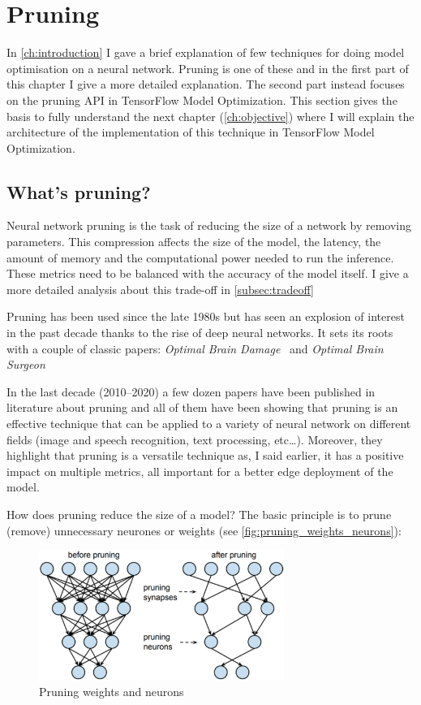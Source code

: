 \chapter{Pruning}\label{ch:pruning}
In \autoref{ch:introduction} I gave a brief explanation of few techniques for
doing model optimisation on a neural network. Pruning is one of these and in
the first part of this chapter I give a more detailed explanation.
The second part instead focuses on the pruning API in TensorFlow Model
Optimization.
This section gives the basis to fully understand the next chapter
(\autoref{ch:objective}) where I will explain the architecture of the
implementation of this technique in TensorFlow Model Optimization.

\section{What's pruning?}
Neural network pruning is the task of reducing the size of a network by
removing parameters. This compression affects the size of the model, the
latency, the amount of memory and the computational power needed to run the
inference. These metrics need to be balanced with the accuracy of the model
itself. I give a more detailed analysis about this trade-off in
\autoref{subsec:tradeoff}

Pruning has been used since the late 1980s but has seen an explosion of
interest in the past decade thanks to the rise of deep neural networks.
It sets its roots with a couple of classic papers: \textit{Optimal Brain
Damage}~\cite{lecun-90b} and \textit{Optimal Brain Surgeon}\cite{hassibi-93}

In the last decade (2010--2020) a few dozen papers have been published in
literature about pruning\cite{blalock2020state} and all of them have been
showing that pruning is an effective technique that can be applied to a variety
of neural network on different fields (image and speech recognition, text
processing, etc\ldots).
Moreover, they highlight that pruning is a versatile technique as, I said
earlier, it has a positive impact on multiple metrics, all important for a
better edge deployment of the model.

How does pruning reduce the size of a model? The basic principle is to prune
(remove) unnecessary neurones or weights (see \autoref{fig:pruning_weights_neurons}):

\begin{figure}[ht]
    \includegraphics[width=8cm]{images/pruning/pruning_weights_neurons.png}
    \centering
    \caption{Pruning weights and neurons}\label{fig:pruning_weights_neurons}
\end{figure}

